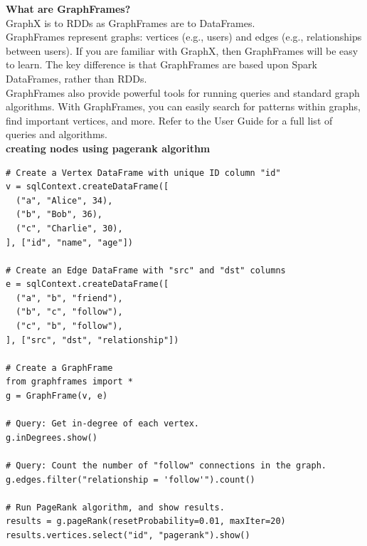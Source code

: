 {\bf What are GraphFrames?}\\
GraphX is to RDDs as GraphFrames are to DataFrames.\\

GraphFrames represent graphs: vertices (e.g., users) and edges (e.g., relationships between users). If you are familiar with GraphX, then GraphFrames will be easy to learn. The key difference is that GraphFrames are based upon Spark DataFrames, rather than RDDs.\\

GraphFrames also provide powerful tools for running queries and standard graph algorithms. With GraphFrames, you can easily search for patterns within graphs, find important vertices, and more. Refer to the User Guide for a full list of queries and algorithms.\\


{\bf creating nodes using pagerank algorithm}
\begin{verbatim}
# Create a Vertex DataFrame with unique ID column "id"
v = sqlContext.createDataFrame([
  ("a", "Alice", 34),
  ("b", "Bob", 36),
  ("c", "Charlie", 30),
], ["id", "name", "age"])

# Create an Edge DataFrame with "src" and "dst" columns
e = sqlContext.createDataFrame([
  ("a", "b", "friend"),
  ("b", "c", "follow"),
  ("c", "b", "follow"),
], ["src", "dst", "relationship"])

# Create a GraphFrame
from graphframes import *
g = GraphFrame(v, e)

# Query: Get in-degree of each vertex.
g.inDegrees.show()

# Query: Count the number of "follow" connections in the graph.
g.edges.filter("relationship = 'follow'").count()

# Run PageRank algorithm, and show results.
results = g.pageRank(resetProbability=0.01, maxIter=20)
results.vertices.select("id", "pagerank").show()
\end{verbatim}
